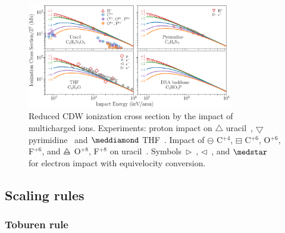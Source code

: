 \documentclass[preprint,showpacs]{revtex4}
\begin{document}
\begin{figure}[t!]
\centering
\includegraphics[width=0.8\textwidth]{figuras/adn2.eps}
\caption{Reduced CDW ionization cross section by the impact of 
multicharged ions. Experiments: proton impact on 
$\triangle$ uracil~\cite{itoh2013}, 
$\bigtriangledown$ pyrimidine~\cite{wolff2014} and $\meddiamond$
THF~\cite{wang2016}. Impact of $\ominus$ C$^{+4}$, 
$\boxminus$ C$^{+6}$, O$^{+6}$, F$^{+6}$, and
$\triangle\mkern-14mu-$ O$^{+8}$, F$^{+8}$ on 
uracil~\cite{agnihotri2012,agnihotri2013}. 
Symbols~$\rhd$~\cite{bug2017}, $\lhd$~\cite{wolf2019}, and 
$\medstar$~\cite{fuss2009} for electron impact with equivelocity 
conversion.}
\label{fig:crossDNA_2}
\end{figure} 

\subsection{Scaling rules}
\label{subsec:scaling}
\subsubsection{Toburen rule}
\end{document}
